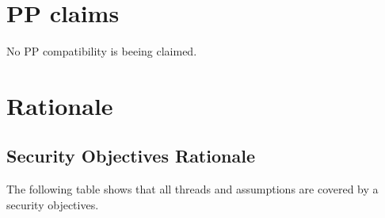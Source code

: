\documentclass[12pt,english]{scrbook}
\begin{document}
\chapter{PP claims}

No PP compatibility is beeing claimed.




\chapter{Rationale}





\section{Security Objectives Rationale}

The following table shows that all threads and assumptions are covered
by a security objectives. 
\end{document}
